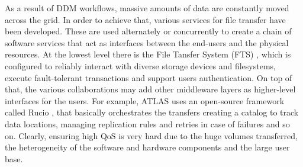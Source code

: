 
As a result of DDM workflows, massive amounts of data are constantly moved across the grid.
In order to achieve that, various services for file transfer have been developed. These are used alternately or concurrently to create a chain of software services that act as interfaces between the end-users and the physical resources.
At the lowest level there is the File Tansfer System (FTS) \cite{karavakis2020fts}, which is configured to reliably interact with diverse storage devices and filesystems, execute fault-tolerant transactions and support users authentication.
On top of that, the various collaborations may add other middleware layers as higher-level interfaces for the users.
For example, ATLAS uses an open-source framework called Rucio \cite{barisits2019rucio}, that basically orchestrates the transfers creating a catalog to track data locations, managing replication rules and retries in case of failures and so on.
Clearly, ensuring high QoS is very hard due to the huge volumes transferred, the heterogeneity of the software and hardware components and the large user base.